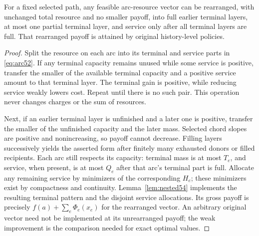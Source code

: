 \begin{lemma}\label{lem:rearrange54}
For a fixed selected path, any feasible arc-resource vector can be rearranged, with unchanged total resource and no smaller payoff, into full earlier terminal layers, at most one partial terminal layer, and service only after all terminal layers are full. That rearranged payoff is attained by original history-level policies.
\end{lemma}
\begin{proof}
Split the resource on each arc into its terminal and service parts in \eqref{eq:arc52}. If any terminal capacity remains unused while some service is positive, transfer the smaller of the available terminal capacity and a positive service amount to that terminal layer. The terminal gain is positive, while reducing service weakly lowers cost. Repeat until there is no such pair. This operation never changes charges or the sum of resources.

Next, if an earlier terminal layer is unfinished and a later one is positive, transfer the smaller of the unfinished capacity and the later mass. Selected chord slopes are positive and nonincreasing, so payoff cannot decrease. Filling layers successively yields the asserted form after finitely many exhausted donors or filled recipients. Each arc still respects its capacity: terminal mass is at most $T_e$, and service, when present, is at most $Q_e$ after that arc's terminal part is full. Allocate any remaining service by minimizers of the corresponding $H_e$; these minimizers exist by compactness and continuity. Lemma~\ref{lem:nested54} implements the resulting terminal pattern and the disjoint service allocations. Its gross payoff is precisely $f(a)+\sum_e\Phi_e(x_e)$ for the rearranged vector. An arbitrary original vector need not be implemented at its unrearranged payoff; the weak improvement is the comparison needed for exact optimal values.
\end{proof}

